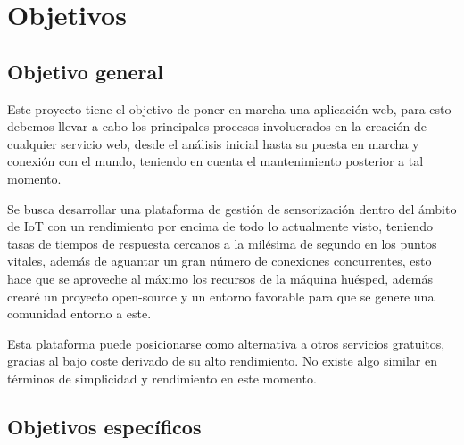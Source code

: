 \chapter{Objetivos}
\label{chap:objetivos}



\section{Objetivo general}

Este proyecto tiene el objetivo de poner en marcha una aplicación web, para esto
debemos llevar a cabo los principales procesos involucrados en la
creación de cualquier servicio web, desde el análisis inicial hasta su puesta en
marcha y conexión con el mundo, teniendo en cuenta el mantenimiento posterior a
tal momento.

Se busca desarrollar una plataforma de gestión de sensorización dentro del ámbito de IoT con un rendimiento
por encima de todo lo actualmente visto, teniendo tasas de tiempos de respuesta
cercanos a la milésima de segundo en los puntos vitales, además de aguantar un
gran número de conexiones concurrentes, esto hace que se aproveche al máximo los recursos de
la máquina huésped, además crearé un proyecto open-source y un entorno favorable para
que se genere una comunidad entorno a este.

Esta plataforma puede posicionarse como alternativa a otros servicios gratuitos,
gracias al bajo coste derivado de su alto rendimiento. No existe algo similar en
términos de simplicidad y rendimiento en este momento.



\section{Objetivos específicos}

